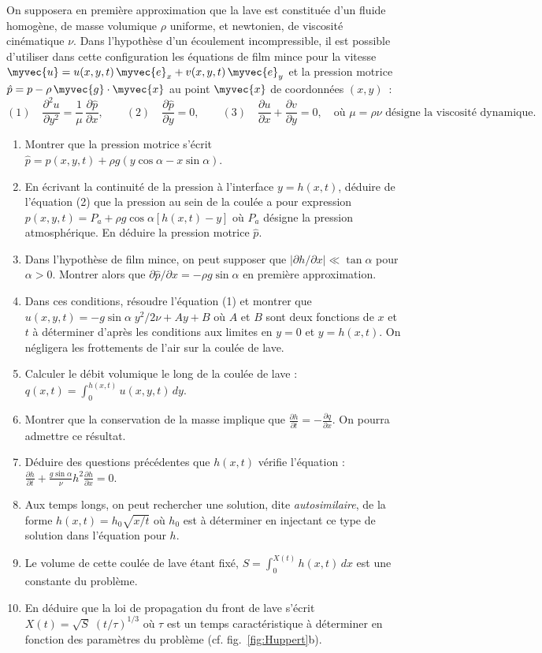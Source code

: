 \noindent
On supposera en première approximation que la lave est constituée d'un fluide homogène, 
de masse volumique $\rho$ uniforme, et newtonien, de viscosité cinématique $\nu$.
Dans l'hypothèse d'un écoulement incompressible, il est possible d'utiliser dans cette
configuration les équations de film mince pour la vitesse 
$\myvec{u} = u(x, y, t) \, \myvec{e}_x + v(x, y, t) \, \myvec{e}_y$
et la pression motrice $\hat{p} = p - \rho \, \myvec{g}\cdot \myvec{x}$ au point $\myvec{x}$ de coordonnées $(x, y)$~:
\[
	(1)\quad \frac{\partial^2 u}{\partial y^2} = \frac{1}{\mu} \, \frac{\partial \hat{p}}{\partial x},
	\qquad 
	(2)\quad \frac{\partial \hat{p}}{\partial y} = 0,
	\qquad
	(3)\quad \frac{\partial u}{\partial x} + \frac{\partial v}{\partial y} = 0,
	\quad \mbox{où $\mu = \rho \nu$ désigne la viscosité dynamique.}
\]
\begin{enumerate}
\item
	Montrer que la pression motrice s'écrit $\hat{p} = p(x, y, t) + \rho g (y\cos\alpha - x\sin\alpha)$.
\item
	En écrivant la continuité de la pression à l'interface $y=h(x, t)$, déduire de l'équation (2) 	
	que la pression au sein de la coulée a pour expression $p(x, y, t) = P_a + \rho g \cos\alpha\left [h(x, t)-y\right ]$ 
	où $P_a$ désigne la pression atmosphérique.
	En déduire la pression motrice $\hat{p}$.
\item
	Dans l'hypothèse de film mince, on peut supposer que $|\partial h/\partial x| \ll \tan\alpha$ pour $\alpha>0$.
	Montrer alors que $\partial \hat{p} / \partial x = -\rho g \sin\alpha$ en première approximation.
\item
	Dans ces conditions, résoudre l'équation (1) et montrer que $u(x, y, t) = -g\sin\alpha\; y^2/2\nu + A y + B$ où $A$ et $B$ sont
	deux fonctions de $x$ et $t$ à déterminer d'après les conditions aux limites en $y=0$ et $y=h(x, t)$.
	On négligera les frottements de l'air sur la coulée de lave.
\item
	Calculer le débit volumique le long de la coulée de lave : $q(x, t) = \displaystyle \int_0^{h(x, t)} u(x, y, t)\, dy$.
\item
	Montrer que la conservation de la masse implique que $\displaystyle \frac{\partial h}{\partial t} = -\frac{\partial q}{\partial x}$.
	On pourra admettre ce résultat.
\item
	Déduire des questions précédentes que $h(x, t)$ vérifie l'équation : 
	$\displaystyle \frac{\partial h}{\partial t} + \frac{g\sin\alpha}{\nu} h^2 \frac{\partial h}{\partial x} =0$.
\item
	Aux temps longs, on peut rechercher une solution, dite \textit{autosimilaire}, de la forme $h(x, t) = h_0\sqrt{x/t}$
	où $h_0$ est à déterminer en injectant ce type de solution dans l'équation pour $h$.
\item
		Le volume de cette coulée de lave étant fixé, $\displaystyle S = \int_0^{X(t)} h(x, t) \, dx$ est une constante du problème.
\item[]
		En déduire que la loi de propagation du front de lave s'écrit $X(t) = \sqrt{S} \; (t/\tau)^{1/3}$ 
		où $\tau$ est un temps caractéristique à déterminer en fonction des paramètres du problème (cf. fig.~\ref{fig:Huppert}b).	
\end{enumerate}


